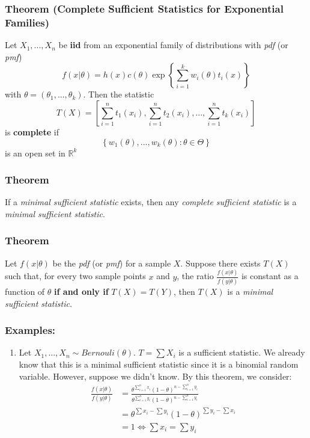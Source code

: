 \documentclass{article}
\begin{document}
\subsubsection{Theorem (Complete Sufficient Statistics for Exponential Families)}

Let $X_1,...,X_n$ be \textbf{iid} from an exponential family of distributions with \textit{pdf} (or \textit{pmf})
\begin{equation*}
    f(x|\theta) = h(x) c(\theta) \exp\left\{ \sum_{i=1}^k w_i(\theta) t_i(x) \right\}
\end{equation*}
with $\theta = (\theta_1,...,\theta_k)$. Then the statistic
\begin{equation*}
    T(X) = \left[\sum_{i=1}^n t_1(x_i), \sum_{i=1}^n t_2(x_i),...,\sum_{i=1}^n t_k(x_i) \right]
\end{equation*}
is \textbf{complete} if
\begin{equation*}
    \left\{w_1(\theta),...,w_k(\theta): \theta \in \Theta \right\}
\end{equation*}
is an open set in $\mathbb{R}^k$

\subsubsection{Theorem}
If a \textit{minimal sufficient statistic} exists, then any \textit{complete sufficient statistic} is a \textit{minimal sufficient statistic}.

\subsubsection{Theorem}
Let $f(x|\theta)$ be the \textit{pdf} (or \textit{pmf}) for a sample $X$. Suppose there exists $T(X)$ such that, for every two sample points $x$ and $y$, the ratio $\frac{f(x|\theta)}{f(y|\theta)}$ is constant as a function of $\theta$ \textbf{if and only if} $T(X) = T(Y)$, then $T(X)$ is a \textit{minimal sufficient statistic}.

\subsubsection*{Examples:}
\begin{enumerate}
    \item Let $X_1,...,X_n \sim Bernouli(\theta)$. $T=\sum X_i$ is a sufficient statistic. We already know that this is a minimal sufficient statistic since it is a binomial random variable. However, suppose we didn't know. By this theorem, we consider:
    \begin{equation*}
        \begin{split}
            \frac{f(x|\theta)}{f(y|\theta)} &= \frac{\theta^{\sum_{i=1}^n x_i} (1-\theta)^{n-\sum_{i=1}^n y_i}}{\theta^{\sum_{i=1}^n y_i} (1-\theta)^{n-\sum_{i=1}^n y_i}}\\
            &= \theta^{\sum x_i - \sum y_i} (1-\theta)^{\sum y_i - \sum x_i}\\
            &= 1 \iff \sum x_i = \sum y_i
        \end{split}
    \end{equation*}
\end{enumerate}
\end{document}

